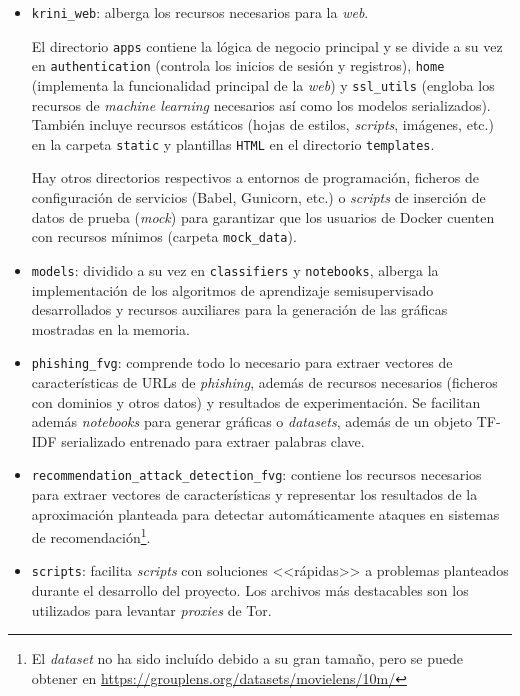 \begin{itemize}
	\item \texttt{krini\_web}: alberga los recursos necesarios para la \textit{web}. 
	
	El directorio \texttt{apps} contiene la lógica de negocio principal y se divide a su vez en \texttt{authentication} (controla los inicios de sesión y registros), \texttt{home} (implementa la funcionalidad principal de la \textit{web}) y \texttt{ssl\_utils} (engloba los recursos de \textit{machine learning} necesarios así como los modelos serializados). También incluye recursos estáticos (hojas de estilos, \textit{scripts}, imágenes, etc.) en la carpeta \texttt{static} y plantillas \texttt{HTML} en el directorio \texttt{templates}.
	
	Hay otros directorios respectivos a entornos de programación, ficheros de configuración de servicios (Babel, Gunicorn, etc.) o \textit{scripts} de inserción de datos de prueba (\textit{mock}) para garantizar que los usuarios de Docker cuenten con recursos mínimos (carpeta \texttt{mock\_data}).
	
	\item \texttt{models}: dividido a su vez en \texttt{classifiers} y \texttt{notebooks}, alberga la implementación de los algoritmos de aprendizaje semisupervisado desarrollados y recursos auxiliares para la generación de las gráficas mostradas en la memoria.
	
	\item \texttt{phishing\_fvg}: comprende todo lo necesario para extraer vectores de características de URLs de \textit{phishing}, además de recursos necesarios (ficheros con dominios y otros datos) y resultados de experimentación. Se facilitan además \textit{notebooks} para generar gráficas o \textit{datasets}, además de un objeto TF-IDF serializado entrenado para extraer palabras clave.
	
	\item \texttt{recommendation\_attack\_detection\_fvg}: contiene los recursos necesarios para extraer vectores de características y representar los resultados de la aproximación planteada para detectar automáticamente ataques en sistemas de recomendación\footnote{El \textit{dataset} no ha sido incluído debido a su gran tamaño, pero se puede obtener en \url{https://grouplens.org/datasets/movielens/10m/}}.
	
	\item \texttt{scripts}: facilita \textit{scripts} con soluciones <<rápidas>> a problemas planteados durante el desarrollo del proyecto. Los archivos más destacables son los utilizados para levantar \textit{proxies} de Tor.


\end{itemize}
